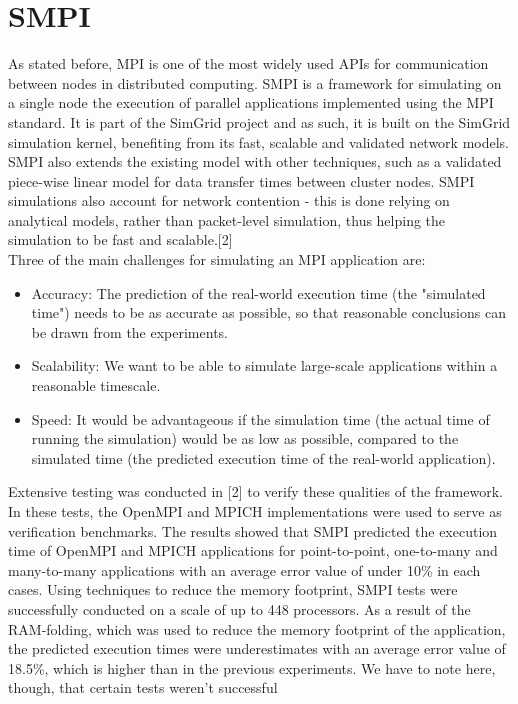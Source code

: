 \section{SMPI}
As stated before, MPI is one of the most widely used APIs for
communication between nodes in distributed computing. SMPI is a
framework for simulating on a single node the execution of parallel
applications implemented using the MPI standard. It is part of the
SimGrid project and as such, it is built on the SimGrid simulation
kernel, benefiting from its fast, scalable and validated network
models. SMPI also extends the existing model with other techniques,
such as a validated piece-wise linear model for data transfer times
between cluster nodes. SMPI simulations also account for network
contention - this is done relying on analytical models, rather than
packet-level simulation, thus helping the simulation to be fast and
scalable.[2]\\
Three of the main challenges for simulating an MPI application are:
\begin{itemize}
\item Accuracy: The prediction of the real-world execution time (the
  "simulated time") needs to be as accurate as possible, so that
  reasonable conclusions can be drawn from the experiments.
\item Scalability: We want to be able to simulate large-scale
  applications within a reasonable timescale.
\item Speed: It would be advantageous if the simulation time (the
  actual time of running the simulation) would be as low as possible,
  compared to the simulated time (the predicted execution time of the
  real-world application).
\end{itemize}
Extensive testing was conducted in [2] to verify these qualities of
the framework. In these tests, the OpenMPI and MPICH implementations
were used to serve as verification benchmarks. The results showed that
SMPI predicted the execution time of OpenMPI and MPICH applications
for point-to-point, one-to-many and many-to-many applications with an
average error value of under 10\% in each cases. Using techniques to
reduce the memory footprint, SMPI tests were successfully conducted on
a scale of up to 448 processors. As a result of the RAM-folding, which
was used to reduce the memory footprint of the application, the
predicted execution times were underestimates with an average error
value of 18.5\%, which is higher than in the previous experiments. We
have to note here, though, that certain tests weren't successful
